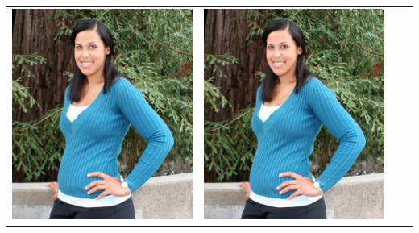\documentclass[landscape,a0paper,fontscale=0.292]{baposter}
\begin{document}
\begin{poster}
{\begin{center}
\begin{tabularx}{\linewidth}{X X X X }
\includegraphics[width=\linewidth]{onasafari.jpg}&
\includegraphics[width=\linewidth]{onasafari.jpg}\\

\end{tabularx}
\end{center}}
\end{poster}
\end{document}
